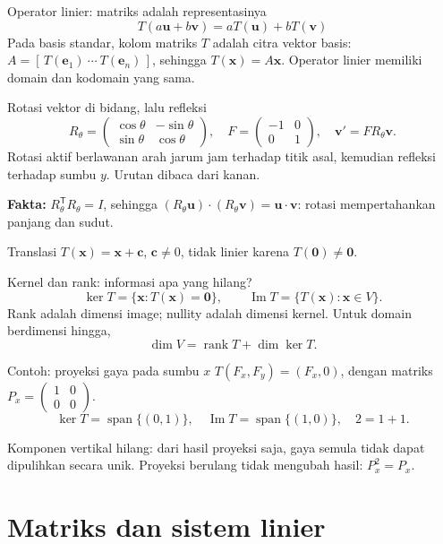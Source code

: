 \documentclass[11pt,aspectratio=169]{beamer}
\newcommand{\vect}[1]{\boldsymbol{#1}}
\DeclareMathOperator{\Span}{span}
\DeclareMathOperator{\rank}{rank}
\begin{document}
\begin{frame}{Operator linier: matriks adalah representasinya}
\small
\[
\boxed{T(a\vect{u}+b\vect{v})=aT(\vect{u})+bT(\vect{v})}
\]
Pada basis standar, kolom matriks $T$ adalah citra vektor basis:
$A=[\,T(\vect{e}_1)\ \cdots\ T(\vect{e}_n)\,]$, sehingga $T(\vect{x})=A\vect{x}$.
Operator linier memiliki domain dan kodomain yang sama.
\begin{block}{Rotasi vektor di bidang, lalu refleksi}
\[
R_\theta=\begin{pmatrix}\cos\theta&-\sin\theta\\\sin\theta&\cos\theta\end{pmatrix},
\quad F=\begin{pmatrix}-1&0\\0&1\end{pmatrix},\quad \vect{v}'=FR_\theta\vect{v}.
\]
Rotasi aktif berlawanan arah jarum jam terhadap titik asal,
kemudian refleksi terhadap sumbu $y$. Urutan dibaca dari kanan.
\end{block}
\textbf{Fakta:} $R_\theta^{\mathsf T}R_\theta=I$, sehingga
$(R_\theta\vect{u})\cdot(R_\theta\vect{v})=\vect{u}\cdot\vect{v}$:
rotasi mempertahankan panjang dan sudut.
\medskip

Translasi $T(\vect{x})=\vect{x}+\vect{c}$, $\vect{c}\ne0$, tidak linier karena $T(\vect{0})\ne\vect{0}$.
\end{frame}

\begin{frame}{Kernel dan rank: informasi apa yang hilang?}
\small
\[
\ker T=\{\vect{x}:T(\vect{x})=\vect{0}\},\qquad
\operatorname{Im}T=\{T(\vect{x}):\vect{x}\in V\}.
\]
Rank adalah dimensi image; nullity adalah dimensi kernel. Untuk domain berdimensi hingga,
\[
\boxed{\dim V=\rank T+\dim\ker T}.
\]
\begin{block}{Contoh: proyeksi gaya pada sumbu $x$}
$T(F_x,F_y)=(F_x,0)$, dengan matriks
$P_x=\begin{pmatrix}1&0\\0&0\end{pmatrix}$.
\[
\ker T=\Span\{(0,1)\},\quad
\operatorname{Im}T=\Span\{(1,0)\},\quad 2=1+1.
\]
\end{block}
Komponen vertikal hilang: dari hasil proyeksi saja, gaya semula tidak dapat
dipulihkan secara unik. Proyeksi berulang tidak mengubah hasil: $P_x^2=P_x$.
\end{frame}

\section{Matriks dan sistem linier}
\end{document}
